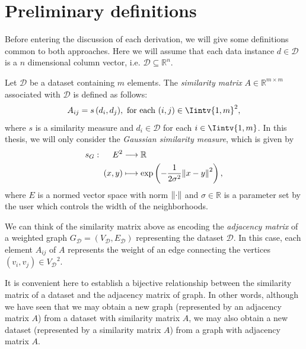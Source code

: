 \section{Preliminary definitions} 
Before entering the discussion of each derivation, we will give some definitions common to both approaches.
Here we will assume that each data instance $d \in \mathcal D$ is a $n$ dimensional column vector, i.e. $\mathcal D \subseteq \mathbb R^{n }$.

\begin{definition}
   Let $\mathcal D$ be a dataset containing $m$ elements. The \textit{similarity matrix} $A \in \mathbb{R}^{m \times m}$ associated with $\mathcal D$ is defined as follows: 
   \begin{equation}
      A_{ij} = s\,(d_i,d_j), \text{ for each } (i,j) \in \Iintv{1,m}^2,
   \end{equation}
   where $s$ is a similarity measure and $d_i \in \mathcal D$ for each $i \in \Iintv{1,m}$.
   In this thesis, we will only consider the \textit{Gaussian similarity measure}, which is given by 
   \begin{equation}
      \begin{split}
         s_G:\,\,\,\,\,\,\,\,   E^2  &\longrightarrow \mathbb R  \\
          (x, y) & \longmapsto \exp \left( -\frac{1}{2 \sigma ^2} {\left\lVert x - y\right\rVert}^2 \right),
      \end{split}
   \end{equation}
   where $E$ is a normed vector space with norm $\left\lVert\cdot\right\rVert$ and $\sigma \in \mathbb R$ is a parameter set by the user which controls the width of the neighborhoods.
\end{definition}

We can think of the similarity matrix above as encoding the \textit{adjacency matrix} of a weighted graph $G_{\mathcal D} = (V_{\mathcal D}, E_{\mathcal D})$ representing the dataset $\mathcal D$. 
In this case, each element $A_{ij}$ of $A$ represents the weight of an edge connecting the vertices $(v_i, v_j) \in {V_{\mathcal D}}^2$.
\begin{remark}
It is convenient here to establish a bijective relationship between the similarity matrix of a dataset and the adjacency matrix of graph.
   In other words, although we have seen that we may obtain a new graph (represented by an adjacency matrix $A$) from a dataset with similarity matrix $A$, we may also obtain a new dataset (represented by a similarity matrix $A$) from a graph with adjacency matrix $A$.
\end{remark}

